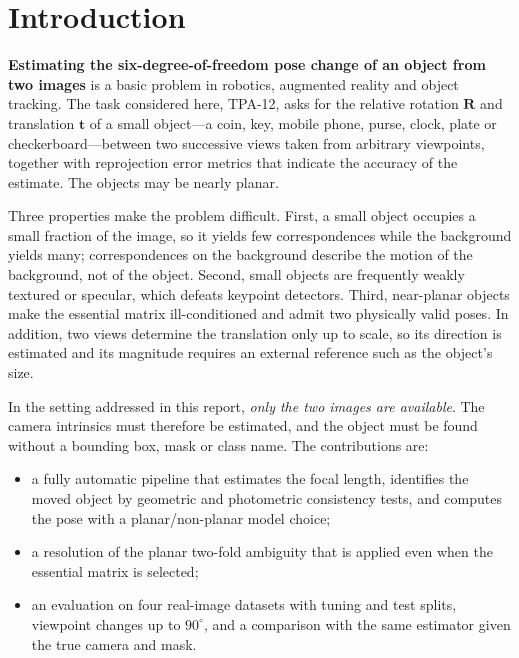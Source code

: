 \documentclass[10pt,a4paper,twocolumn]{article}
\newcommand{\R}{\mathbf{R}}
\newcommand{\tv}{\mathbf{t}}
\begin{document}
\section{Introduction}

\textbf{Estimating the six-degree-of-freedom pose change of an object from two images} is a basic problem in robotics, augmented reality and object tracking. The task considered here, TPA-12, asks for the relative rotation $\R$ and translation $\tv$ of a small object---a coin, key, mobile phone, purse, clock, plate or checkerboard---between two successive views taken from arbitrary viewpoints, together with reprojection error metrics that indicate the accuracy of the estimate. The objects may be nearly planar.

Three properties make the problem difficult. First, a small object occupies a small fraction of the image, so it yields few correspondences while the background yields many; correspondences on the background describe the motion of the background, not of the object. Second, small objects are frequently weakly textured or specular, which defeats keypoint detectors. Third, near-planar objects make the essential matrix ill-conditioned and admit two physically valid poses. In addition, two views determine the translation only up to scale, so its direction is estimated and its magnitude requires an external reference such as the object's size.

In the setting addressed in this report, \emph{only the two images are available}. The camera intrinsics must therefore be estimated, and the object must be found without a bounding box, mask or class name. The contributions are:
\begin{itemize}
  \item a fully automatic pipeline that estimates the focal length, identifies the moved object by geometric and photometric consistency tests, and computes the pose with a planar/non-planar model choice;
  \item a resolution of the planar two-fold ambiguity that is applied even when the essential matrix is selected;
  \item an evaluation on four real-image datasets with tuning and test splits, viewpoint changes up to $90^\circ$, and a comparison with the same estimator given the true camera and mask.
\end{itemize}

\end{document}
